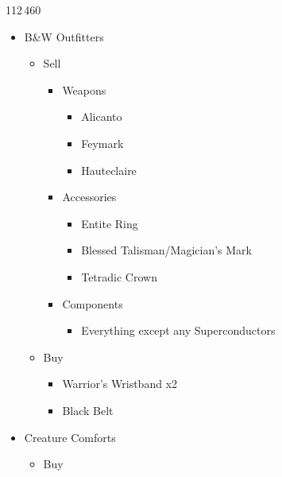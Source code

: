 \begin{shop}{112\,460}
  \begin{multicols}{2}
    \begin{itemize}
      \item B\&W Outfitters
            \begin{itemize}
              \item Sell
                    \begin{itemize}
                      \item Weapons
                            \begin{itemize}
                              \item Alicanto
                              \item Feymark
                              \item Hauteclaire
                            \end{itemize}
                      \item Accessories
                            \begin{itemize}
                              \item Entite Ring
                              \item Blessed Talisman/Magician's Mark
                              \item Tetradic Crown
                            \end{itemize}
                      \item Components
                            \begin{itemize}
                              \item Everything except any Superconductors
                            \end{itemize}
                    \end{itemize}
              \item Buy
                    \begin{itemize}
                      \item Warrior's Wristband x2
                      \item Black Belt
                    \end{itemize}
            \end{itemize}
            \columnbreak
      \item Creature Comforts
            \begin{itemize}
              \item Buy

\end{itemize}
\end{itemize}
\end{multicols}
\end{shop}
